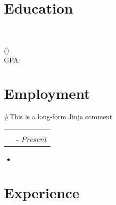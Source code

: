 \documentclass{article}
\makeatletter
\newcommand{\resumeSubheading}[4]{
\vspace{-1pt}\item[]
\begin{tabular*}{\textwidth}{@{}l@{\extracolsep{\fill}}r}
      \textbf{#1} & \textbf{#2} \\
      \textit{\small#3} & \textit{\small #4} \\
    \end{tabular*}\vspace{-5pt}
}
\makeatother
\begin{document}
\noindent\begin{minipage}{0.5\textwidth}
	\begin{flushleft}
	\large \textbf{} \\
	 \\
	 \\
	\end{flushleft}
\end{minipage}%
\hfill
\begin{minipage}{0.5\textwidth}
	\begin{flushright}
	 \\
	 \\
	\end{flushright}
\end{minipage}%

\section{Education}
	\textbf{}\\
	 \\
	 (\textit{}) \\
	GPA: 

\section{Employment}
\#{This is a long-form Jinja comment}
\begin{description}
	\resumeSubheading
	{\VAR{position.title}}
	{\VAR{position.entity}}
	{\VAR{position.location}}
	{
	\VAR{position.start.month}
	\VAR{position.start.year}
	-
	\BLOCK{ if "stop" in position }
		\VAR{position.stop.month}
		\VAR{position.stop.year}
	\BLOCK{ else }
		Present
	\BLOCK{ endif }
	}
	\begin{itemize}
		\item {}
\end{itemize}
\end{description}

\section{Experience}
\end{document}
